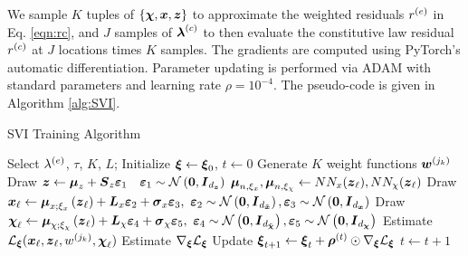We sample $K$ tuples of $\{\boldsymbol{\chi}, \boldsymbol{x}, \boldsymbol{z}\}$ to approximate the weighted residuals $r^{(e)}$ in Eq. \ref{eqn:rc}, and $J$ samples of $\boldsymbol{\lambda}^{(c)}$ to then evaluate the constitutive law residual $r^{(c)}$ at $J$ locations times $K$ samples. The gradients are computed using PyTorch's automatic differentiation. Parameter updating is performed via ADAM with standard parameters and learning rate $\rho = 10^{-4}$. The pseudo-code is given in Algorithm \ref{alg:SVI}.

\begin{algorithm}[t]
\caption{SVI Training Algorithm}\label{alg:SVI}
\begin{algorithmic}
\State Select $\lambda^{(e)}$, $\tau$, $K$, $L$; Initialize $\boldsymbol{\xi} \leftarrow \boldsymbol{\xi}_0$, $t \leftarrow 0$
\State Generate $K$ weight functions $\boldsymbol{w}^{(j_k)}$ 
\State Draw $\boldsymbol{z} \leftarrow \boldsymbol{\mu}_z + \boldsymbol{S}_z \boldsymbol{\varepsilon}_1 \quad  \boldsymbol{\varepsilon}_1 \sim \mathcal{N}\left(\boldsymbol{0}, \boldsymbol{I}_{d_{\boldsymbol{z}}}\right)$
\State $\boldsymbol{\mu}_{n,\xi_x}, \boldsymbol{\mu}_{n,\xi_\chi}   \leftarrow NN_x(\boldsymbol{z}_\ell), NN_\chi(\boldsymbol{z}_\ell)$
\State Draw $\boldsymbol{x}_\ell \leftarrow \boldsymbol{\mu}_{x;\xi_x}\left( \boldsymbol{z}_\ell \right) + \boldsymbol{L}_x \boldsymbol{\varepsilon}_2 + \boldsymbol{\sigma}_x \boldsymbol{\varepsilon}_3, \  \boldsymbol{\varepsilon}_2 \sim \mathcal{N}\left(\boldsymbol{0}, \boldsymbol{I}_{d_{\tilde{\boldsymbol{x}}}}\right), \boldsymbol{\varepsilon}_3\sim \mathcal{N}\left(\boldsymbol{0}, \boldsymbol{I}_{d_{\boldsymbol{x}}}\right)$ 
\State Draw $\boldsymbol{\chi}_\ell \leftarrow \boldsymbol{\mu}_{\chi;\xi_\chi}\left( \boldsymbol{z}_\ell \right) + \boldsymbol{L}_\chi \boldsymbol{\varepsilon}_4 + \boldsymbol{\sigma}_\chi \boldsymbol{\varepsilon}_5, \  \boldsymbol{\varepsilon}_4 \sim \mathcal{N}\left(\boldsymbol{0}, \boldsymbol{I}_{d_{\tilde{\boldsymbol{\chi}}}}\right), \boldsymbol{\varepsilon}_5\sim \mathcal{N}\left(\boldsymbol{0}, \boldsymbol{I}_{d_{\boldsymbol{\chi}}}\right)$ 
\EndFor
\State Estimate $\mathcal{L}_{\boldsymbol{\xi}}(\boldsymbol{x}_\ell, \boldsymbol{z}_\ell, w^{(j_k)}, \boldsymbol{\chi}_\ell)$ 
\State Estimate $\nabla_{\boldsymbol{\xi}} \mathcal{L}_{\boldsymbol{\xi}}$
\State Update $\boldsymbol{\xi}_{t + 1} \leftarrow \boldsymbol{\xi}_{t} + \boldsymbol{\rho}^{(t)} \odot \nabla_{\boldsymbol{\xi}} \mathcal{L}_{\boldsymbol{\xi}}$ 
\State $t \leftarrow t + 1$
\EndWhile 
\end{algorithmic}
\end{algorithm}


